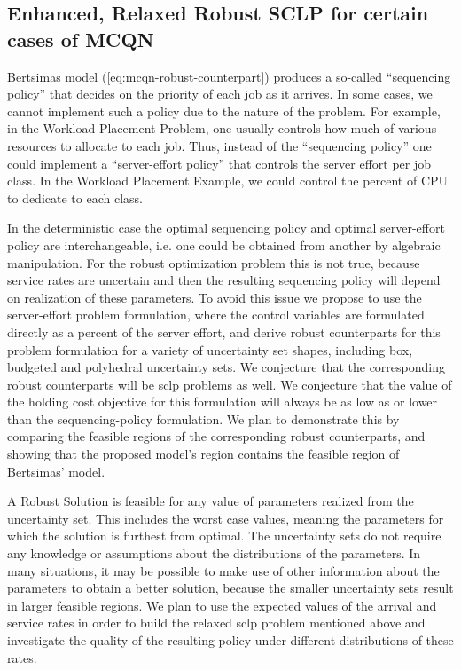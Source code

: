 \documentclass[11pt,a4paper,titlepage]{article}
\theoremstyle{definition}
\theoremstyle{plain}
\begin{document}
    \subsection{Enhanced, Relaxed Robust SCLP for certain cases of MCQN}
    \label{subsec:topics:enhanced-robust-sclp}


    Bertsimas model (\ref{eq:mcqn-robust-counterpart})
    produces a so-called  ``sequencing policy'' that decides on the priority of each job as it arrives.
    In some cases,
    we cannot implement such a policy due to the nature of the problem.
    For example,
    in the Workload Placement Problem,
    one usually controls how much of various resources to allocate to
    each job.
    Thus,
    instead of the ``sequencing policy'' one could implement a ``server-effort policy'' that controls the server effort per job class.
    In the Workload Placement Example,
    we could control the percent of CPU to dedicate to each class.

    In the deterministic case the optimal sequencing policy and optimal server-effort policy are interchangeable,
    i.e. one could be obtained from another by algebraic manipulation.
    For the robust optimization problem this is not true,
    because service rates are uncertain and then the resulting sequencing policy will depend on realization of these parameters.
    To avoid this issue we propose to use the server-effort problem formulation,
    where the control variables are formulated directly as a percent of the server effort,
    and derive robust counterparts for this problem formulation for a variety of uncertainty set shapes,
    including  box, budgeted and polyhedral uncertainty sets.
    We conjecture that the corresponding robust counterparts will be \gls{sclp} problems as well.
    We conjecture that the value of the holding cost objective for this formulation will always be as low as or lower than the sequencing-policy formulation.
    We plan to demonstrate this by comparing the feasible regions of the corresponding robust counterparts,
    and showing that the proposed model's region contains the feasible region of Bertsimas' model.

    A Robust Solution is feasible for any value of parameters realized from the uncertainty set.
    This includes the worst case values,
    meaning the parameters for which the solution is furthest from optimal.
    The uncertainty sets do not require any knowledge or assumptions about the distributions of the parameters.
    In many situations,
    it may be possible to make use of other information about the parameters
    to obtain a better solution,
    because the smaller uncertainty sets result in larger feasible regions.
    We plan to use the expected values of the arrival and service rates in order to build the relaxed \gls{sclp} problem mentioned above and investigate the quality of the resulting policy under different distributions of these rates.
\end{document}
